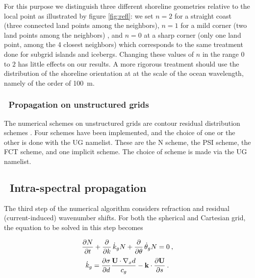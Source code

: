 For this purpose we distinguish three different shoreline geometries relative to the local point as illustrated by 
figure \ref{fig:refl}: we set  $n=2$ for a straight coast (three connected land points 
among the neighbors), $n=1$ for a mild corner (two land points 
among the neighbors) , and $n=0$ at a sharp corner (only one land point, among the 4 closest neighbors) which corresponds to the 
same treatment done for subgrid islands and icebergs. Changing these values of $n$ in the range $0$ to $2$  has little effects on our results. A more rigorous 
treatment should use the distribution of the shoreline orientation at at the scale of the ocean wavelength, namely of the order of 100~m. 

\vsssub
\subsubsection{~Propagation on unstructured grids} \label{sec_prug}
\vsssub

The numerical schemes on unstructured grids are contour residual distribution schemes \citep[][for a review]{PhD:Rol}. Four schemes have been implemented, and the choice 
of one or the other is done with the UG namelist. These are the N scheme, the PSI scheme, the FCT scheme, and one implicit scheme. The choice of scheme is made via the 
UG namelist. 


\vssub
\subsection{~Intra-spectral propagation}
\vssub

The third step of the numerical algorithm considers refraction and residual
(current-induced) wavenumber shifts. For both the spherical and Cartesian
grid, the equation to be solved in this step becomes


\begin{equation}
\frac{\partial N}{\partial t} + \frac{\partial}{\partial k} \, \dot{k}_g N +
\frac{\partial}{\partial \theta} \, \dot{\theta}_g N = 0
\: , \label{eq:step_intra} \end{equation} \begin{equation}
\dot{k}_g  = \frac{\partial \sigma}{\partial d} 
    \frac{{\bf U} \cdot \nabla_x d}{c_g}  -
    {\bf k} \cdot \frac{\partial {\bf U}}{\partial s}
\: . \label{eq:k_dot_g} \end{equation}

